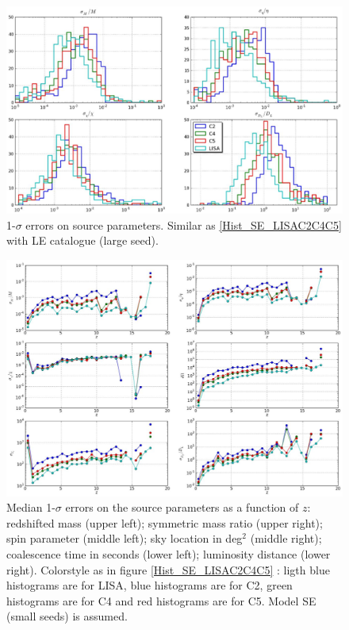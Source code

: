 \documentclass{iopart}
\begin{document}
\begin{figure}[H]
\center
   \includegraphics[width=1\textwidth]{FigSMBHPhenomAEI/Hist_LE_LISAC2C4C5.eps}
\caption{1-$\sigma$ errors on source parameters. Similar as \ref{Hist_SE_LISAC2C4C5} with LE catalogue (large seed).
\label{Hist_LE_LISAC2C4C5} } 
\end{figure}



\begin{figure}[H]
\center
   \includegraphics[width=\textwidth]{FigSMBHPhenomAEI/MedianErrs_SE_LISAC2C4C5.eps}
\caption{Median 1-$\sigma$ errors on the source parameters as a function of 
$z$: redshifted mass (upper left); symmetric mass ratio (upper right); spin parameter (middle left); sky location in deg$^2$ (middle right); coalescence time in seconds (lower left); luminosity distance (lower right). Colorstyle as in figure \ref{Hist_SE_LISAC2C4C5} : ligth blue histograms are for LISA, blue histograms are for C2, green histograms are for C4 and red histograms are for C5. Model SE (small seeds) is assumed.
\label{MedianErrs_SE_LISAC2C4C5} } 
\end{figure}
\end{document}
